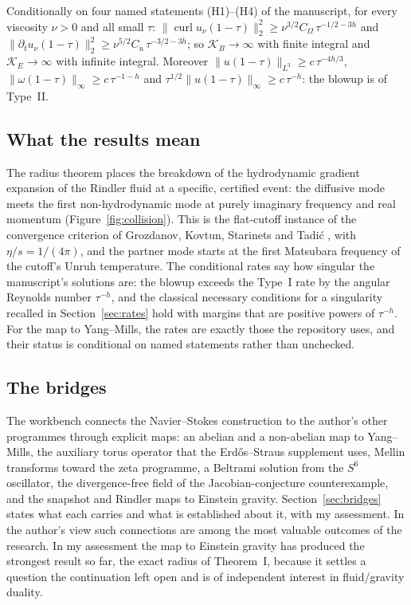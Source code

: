 \begin{introthm}
Conditionally on four named statements (H1)--(H4) of the manuscript, for every viscosity $\nu>0$ and all small $\tau$:
$\|\operatorname{curl}u_\nu(1-\tau)\|_2^2\ge\nu^{3/2}C_\Omega\,\tau^{-1/2-3h}$ and $\|\partial_tu_\nu(1-\tau)\|_2^2\ge\nu^{5/2}C_{\dot u}\,\tau^{-3/2-3h}$; so $\mathcal K_B\to\infty$ with finite integral and $\mathcal K_E\to\infty$ with infinite integral. Moreover $\|u(1-\tau)\|_{L^3}\ge c\,\tau^{-4h/3}$, $\|\omega(1-\tau)\|_\infty\ge c\,\tau^{-1-h}$ and $\tau^{1/2}\|u(1-\tau)\|_\infty\ge c\,\tau^{-h}$: the blowup is of Type~II.
\end{introthm}

\subsection*{What the results mean}

The radius theorem places the breakdown of the hydrodynamic gradient expansion of the Rindler fluid at a specific, certified event: the diffusive mode meets the first non-hydrodynamic mode at purely imaginary frequency and real momentum (Figure~\ref{fig:collision}). This is the flat-cutoff instance of the convergence criterion of Grozdanov, Kovtun, Starinets and Tadić \cite{GKST}, with $\eta/s=1/(4\pi)$, and the partner mode starts at the first Matsubara frequency of the cutoff's Unruh temperature. The conditional rates say how singular the manuscript's solutions are: the blowup exceeds the Type~I rate by the angular Reynolds number $\tau^{-h}$, and the classical necessary conditions for a singularity recalled in Section~\ref{sec:rates} hold with margins that are positive powers of $\tau^{-h}$. For the map to Yang--Mills, the rates are exactly those the repository uses, and their status is conditional on named statements rather than unchecked.

\subsection*{The bridges}

The workbench connects the Navier--Stokes construction to the author's other programmes through explicit maps: an abelian and a non-abelian map to Yang--Mills, the auxiliary torus operator that the Erdős--Straus supplement uses, Mellin transforms toward the zeta programme, a Beltrami solution from the $S^6$ oscillator, the divergence-free field of the Jacobian-conjecture counterexample, and the snapshot and Rindler maps to Einstein gravity. Section~\ref{sec:bridges} states what each carries and what is established about it, with my assessment. In the author's view such connections are among the most valuable outcomes of the research. In my assessment the map to Einstein gravity has produced the strongest result so far, the exact radius of Theorem~I, because it settles a question the continuation left open and is of independent interest in fluid/gravity duality.

